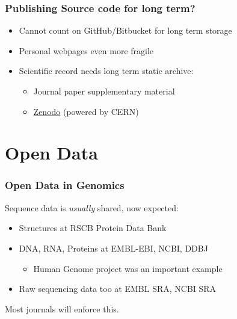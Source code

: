 \begin{frame}
  \frametitle{Publishing Source code for long term?}
  \begin{itemize}
    \item Cannot count on GitHub/Bitbucket for long term storage
    \item Personal webpages even more fragile
    \item Scientific record needs long term static archive:
      \begin{itemize}
        \item Journal paper supplementary material
        \item \href{http://about.zenodo.org/}{Zenodo} (powered by CERN)
      \end{itemize}
  \end{itemize}
\end{frame}

\section{Open Data}

\begin{frame}
  \frametitle{Open Data in Genomics}
  Sequence data is \emph{usually} shared, now expected:
  \begin{itemize}
    \item Structures at RSCB Protein Data Bank
    \item DNA, RNA, Proteins at EMBL-EBI, NCBI, DDBJ
      \begin{itemize}
        \item{Human Genome project was an important example}
      \end{itemize}
    \item Raw sequencing data too at EMBL SRA, NCBI SRA
  \end{itemize}
  Most journals will enforce this.
\end{frame}

